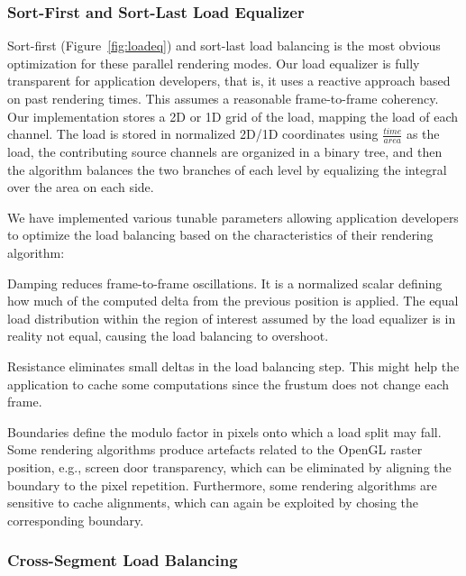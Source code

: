 \documentclass[10pt,journal,compsoc]{IEEEtran}
\newcommand{\fig}[1]{Figure~\ref{#1}}
\begin{document}
\subsubsection{Sort-First and Sort-Last Load Equalizer}

Sort-first (\fig{fig:loadeq}) and sort-last load balancing is the most obvious
optimization for these parallel rendering modes. Our load equalizer is fully
transparent for application developers, that is, it uses a reactive approach
based on past rendering times. This assumes a reasonable frame-to-frame
coherency. Our implementation stores a 2D or 1D grid of the load, mapping the
load of each channel. The load is stored in normalized 2D/1D coordinates using
$\frac{time}{area}$ as the load, the contributing source channels are organized
in a binary tree, and then the algorithm balances the two branches of each level
by equalizing the integral over the area on each side.

We have implemented various tunable parameters allowing application developers
to optimize the load balancing based on the characteristics of their rendering
algorithm:

\begin{compactdesc}
\item[Damping] reduces frame-to-frame oscillations. It is a normalized scalar
  defining how much of the computed delta from the previous position is
  applied. The equal load distribution within the region of interest assumed by
  the load equalizer is in reality not equal, causing the load balancing to
  overshoot.
\item[Resistance] eliminates small deltas in the load balancing step. This might
  help the application to cache some computations since the frustum does not
  change each frame.
\item[Boundaries] define the modulo factor in pixels onto which a load split may
  fall. Some rendering algorithms produce artefacts related to the OpenGL raster
  position, e.g., screen door transparency, which can be eliminated by aligning
  the boundary to the pixel repetition. Furthermore, some rendering algorithms
  are sensitive to cache alignments, which can again be exploited by chosing the
  corresponding boundary.
\end{compactdesc}

\subsubsection{Cross-Segment Load Balancing}
\end{document}
